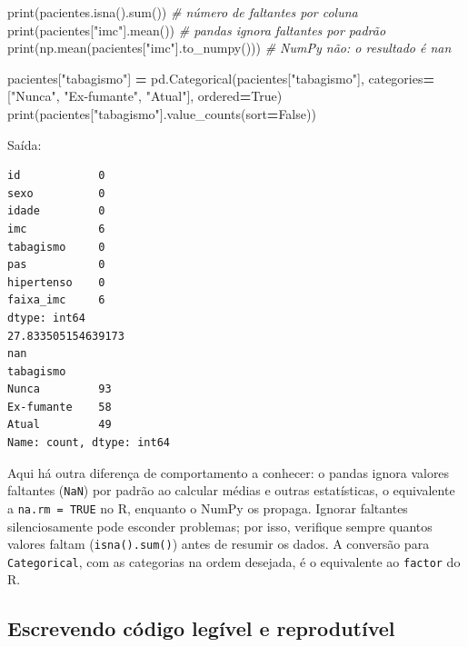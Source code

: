 \documentclass[
]{book}
\newenvironment{Shaded}{\begin{snugshade}}{\end{snugshade}}
\newcommand{\BuiltInTok}[1]{#1}
\newcommand{\CommentTok}[1]{\textcolor[rgb]{0.56,0.35,0.01}{\textit{#1}}}
\newcommand{\NormalTok}[1]{#1}
\newcommand{\OperatorTok}[1]{\textcolor[rgb]{0.81,0.36,0.00}{\textbf{#1}}}
\newcommand{\StringTok}[1]{\textcolor[rgb]{0.31,0.60,0.02}{#1}}
\newcommand{\VariableTok}[1]{\textcolor[rgb]{0.00,0.00,0.00}{#1}}
\begin{document}
\begin{Shaded}
\begin{Highlighting}[]
\BuiltInTok{print}\NormalTok{(pacientes.isna().}\BuiltInTok{sum}\NormalTok{())                     }\CommentTok{\# número de faltantes por coluna}
\BuiltInTok{print}\NormalTok{(pacientes[}\StringTok{"imc"}\NormalTok{].mean())                    }\CommentTok{\# pandas ignora faltantes por padrão}
\BuiltInTok{print}\NormalTok{(np.mean(pacientes[}\StringTok{"imc"}\NormalTok{].to\_numpy()))       }\CommentTok{\# NumPy não: o resultado é nan}

\NormalTok{pacientes[}\StringTok{"tabagismo"}\NormalTok{] }\OperatorTok{=}\NormalTok{ pd.Categorical(pacientes[}\StringTok{"tabagismo"}\NormalTok{],}
\NormalTok{                                        categories}\OperatorTok{=}\NormalTok{[}\StringTok{"Nunca"}\NormalTok{, }\StringTok{"Ex{-}fumante"}\NormalTok{, }\StringTok{"Atual"}\NormalTok{],}
\NormalTok{                                        ordered}\OperatorTok{=}\VariableTok{True}\NormalTok{)}
\BuiltInTok{print}\NormalTok{(pacientes[}\StringTok{"tabagismo"}\NormalTok{].value\_counts(sort}\OperatorTok{=}\VariableTok{False}\NormalTok{))}
\end{Highlighting}
\end{Shaded}

Saída:

\begin{verbatim}
id            0
sexo          0
idade         0
imc           6
tabagismo     0
pas           0
hipertenso    0
faixa_imc     6
dtype: int64
27.833505154639173
nan
tabagismo
Nunca         93
Ex-fumante    58
Atual         49
Name: count, dtype: int64
\end{verbatim}

Aqui há outra diferença de comportamento a conhecer: o pandas ignora valores faltantes (\texttt{NaN}) por padrão ao calcular médias e outras estatísticas, o equivalente a \texttt{na.rm\ =\ TRUE} no R, enquanto o NumPy os propaga. Ignorar faltantes silenciosamente pode esconder problemas; por isso, verifique sempre quantos valores faltam (\texttt{isna().sum()}) antes de resumir os dados. A conversão para \texttt{Categorical}, com as categorias na ordem desejada, é o equivalente ao \texttt{factor} do R.

\subsection{Escrevendo código legível e reprodutível}\label{escrevendo-cuxf3digo-leguxedvel-e-reprodutuxedvel}
\end{document}
